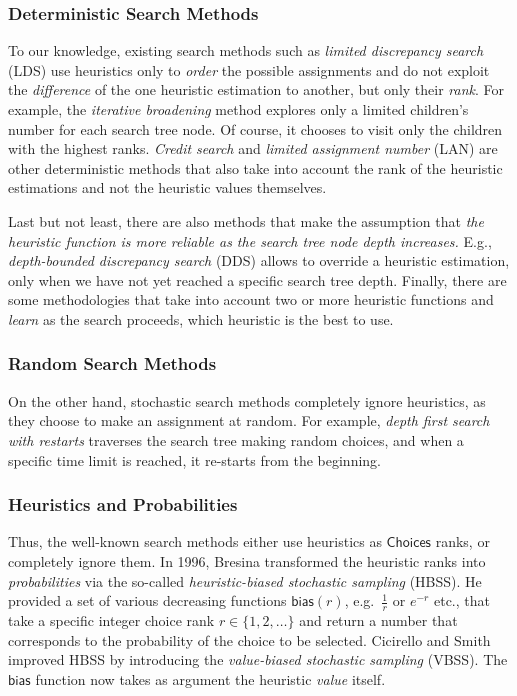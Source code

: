 \documentclass{ws-ijait}
\begin{document}
\subsubsection{Deterministic Search Methods\label{deterministic}}

To our knowledge, existing search methods such as \emph{limited discrepancy search} (LDS) use heuristics only to \emph{order} the possible assignments and do not exploit the \emph{difference} of the one heuristic estimation to another, but only their \emph{rank}.\cite{lds} For example, the \emph{iterative broadening} method explores only a limited children's number for each search tree node.\cite{ibroad} Of course, it chooses to visit only the children with the highest ranks. \emph{Credit search}\cite{dbs} and \emph{limited assignment number} (LAN)\cite{lan} are other deterministic methods that also take into account the rank of the heuristic estimations and not the heuristic values themselves.

Last but not least, there are also methods that make the assumption that \emph{the heuristic function is more reliable as the search tree node depth increases.} E.g., \emph{depth-bounded discrepancy search} (DDS) allows to override a heuristic estimation, only when we have not yet reached a specific search tree depth.\cite{dds} Finally, there are some methodologies that take into account two or more heuristic functions and \emph{learn} as the search proceeds, which heuristic is the best to use.\cite{learn}


\subsubsection{Random Search Methods\label{random}}

On the other hand, stochastic search methods completely ignore heuristics, as they choose to make an assignment at random.\cite{heuristics} For example, \emph{depth first search with restarts} traverses the search tree making random choices, and when a specific time limit is reached, it re-starts from the beginning.


\subsubsection{Heuristics and Probabilities}

Thus, the well-known search methods either use heuristics as $\mathsf{Choices}$ ranks, or completely ignore them. In 1996, Bresina transformed the heuristic ranks into \emph{probabilities} via the so-called \emph{heuristic-biased stochastic sampling} (HBSS).\cite{bresina-hbss} He provided a set of various decreasing functions $\mathsf{bias}(r)$, e.g.\ $\frac{1}{r}$ or $e^{-r}$ etc., that take a specific integer choice rank $r \in \{1, 2, \ldots\}$ and return a number that corresponds to the probability of the choice to be selected. Cicirello and Smith improved HBSS by introducing the \emph{value-biased stochastic sampling} (VBSS). The $\mathsf{bias}$ function now takes as argument the heuristic \emph{value} itself.\cite{cicirello-vbss}
\end{document}
